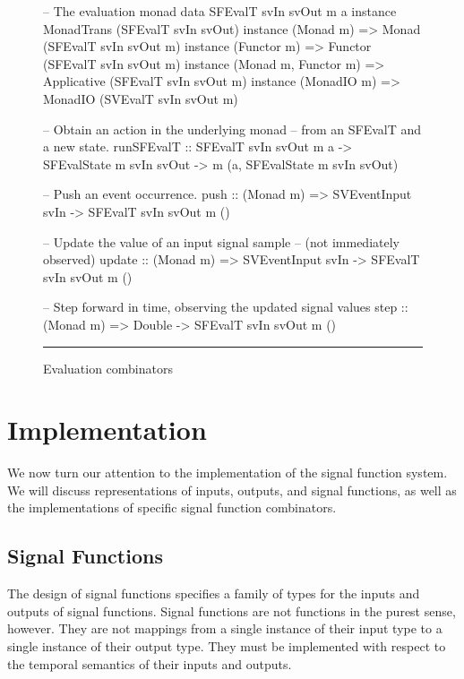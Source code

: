 \documentclass[draft]{llncs}
\begin{document}
\begin{figure}
\begin{code}
-- The evaluation monad
data SFEvalT svIn svOut m a
instance MonadTrans (SFEvalT svIn svOut)
instance (Monad m) => Monad (SFEvalT svIn svOut m)
instance (Functor m) => Functor (SFEvalT svIn svOut m)
instance (Monad m, Functor m) => Applicative (SFEvalT svIn svOut m)
instance (MonadIO m) => MonadIO (SVEvalT svIn svOut m)

-- Obtain an action in the underlying monad
-- from an SFEvalT and a new state.
runSFEvalT ::    SFEvalT svIn svOut m a
              -> SFEvalState m svIn svOut
              -> m (a, SFEvalState m svIn svOut)

-- Push an event occurrence.
push :: (Monad m) => SVEventInput svIn -> SFEvalT svIn svOut m ()

-- Update the value of an input signal sample
-- (not immediately observed)
update :: (Monad m) => SVEventInput svIn -> SFEvalT svIn svOut m ()

-- Step forward in time, observing the updated signal values
step :: (Monad m) => Double -> SFEvalT svIn svOut m ()
\end{code}
\hrule
\caption{Evaluation combinators}
\label{figure:evaluation_combinators}
\end{figure}

\section{Implementation}
\label{section:Implementation}

We now turn our attention to the implementation of the signal function
system. We will discuss representations of inputs, outputs, and signal functions,
as well as the implementations of specific signal function combinators.

\subsection{Signal Functions}
\label{subsection:Implementation-Signal_Functions}

The design of signal functions specifies a family of types for the inputs and
outputs of signal functions. Signal functions are not functions in the purest
sense, however. They are not mappings from a single instance of their input
type to a single instance of their output type. They must be implemented with
respect to the temporal semantics of their inputs and outputs.
\end{document}
